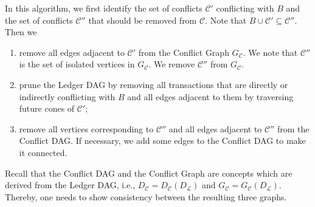 \documentclass[11pt]{article}
\newcommand{\conflictset}{\mathcal{C}}
\newcommand{\ledger}{\mathcal{L}}
\newcommand{\LedgerDAG}{D_{\ledger}}
\newcommand{\ConflictDAG}{D_{\conflictset}}
\newcommand{\ConflictGraph}{G_{\conflictset}}
\theoremstyle{plain}
\theoremstyle{definition}
\numberwithin{definition}{section}
\numberwithin{lemma}{section}
\numberwithin{ass}{section}
\numberwithin{remark}{section}
\numberwithin{example}{section}
\numberwithin{proposition}{section}
\numberwithin{theorem}{section}
\begin{document}
In this algorithm, we first identify  the set of conflicts $\conflictset'$ conflicting with $B$ and the set of conflicts $\conflictset''$ that should be removed from $\conflictset$. Note that $B\cup \conflictset' \subseteq \conflictset''$. 
Then we
\begin{enumerate}[leftmargin=*]
    \item remove all edges adjacent to $\conflictset'$ from the Conflict Graph $\ConflictGraph$. We note that $\conflictset''$ is the set of isolated vertices in $\ConflictGraph$. We remove $\conflictset''$  from $\ConflictGraph$.
    \item prune the Ledger DAG by removing all transactions that are directly or indirectly conflicting with ${B}$ and all edges adjacent to them by traversing future cones of $\conflictset'$;
    \item remove all vertices corresponding to $\conflictset''$  and all edges adjacent to $\conflictset''$ from the Conflict DAG. If necessary, we add some edges to the Conflict DAG to make it connected.
\end{enumerate} 

Recall that the Conflict DAG and the Conflict Graph are concepts which are derived from the Ledger DAG, i.e., $\ConflictDAG = \ConflictDAG(\LedgerDAG)$ and $\ConflictGraph = \ConflictGraph(\LedgerDAG)$. Thereby, one needs to show consistency between the resulting three graphs.
\end{document}
